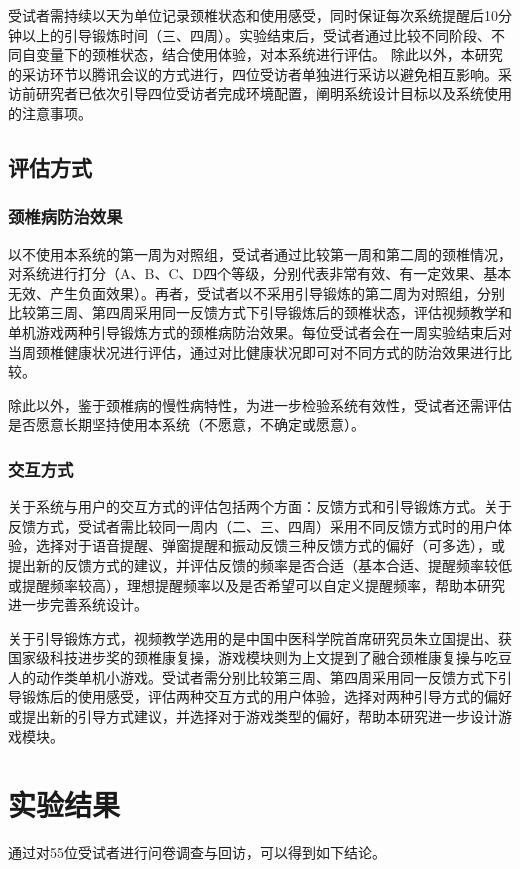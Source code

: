 \documentclass[12pt,a4paper]{article}%
\begin{document}
受试者需持续以天为单位记录颈椎状态和使用感受，同时保证每次系统提醒后10分钟以上的引导锻炼时间（三、四周）。实验结束后，受试者通过比较不同阶段、不同自变量下的颈椎状态，结合使用体验，对本系统进行评估。
除此以外，本研究的采访环节以腾讯会议的方式进行，四位受访者单独进行采访以避免相互影响。采访前研究者已依次引导四位受访者完成环境配置，阐明系统设计目标以及系统使用的注意事项。
\subsection{评估方式}
\subsubsection{颈椎病防治效果}
以不使用本系统的第一周为对照组，受试者通过比较第一周和第二周的颈椎情况，对系统进行打分（A、B、C、D四个等级，分别代表非常有效、有一定效果、基本无效、产生负面效果）。再者，受试者以不采用引导锻炼的第二周为对照组，分别比较第三周、第四周采用同一反馈方式下引导锻炼后的颈椎状态，评估视频教学和单机游戏两种引导锻炼方式的颈椎病防治效果。每位受试者会在一周实验结束后对当周颈椎健康状况进行评估，通过对比健康状况即可对不同方式的防治效果进行比较。


除此以外，鉴于颈椎病的慢性病特性，为进一步检验系统有效性，受试者还需评估是否愿意长期坚持使用本系统（不愿意，不确定或愿意）。
\subsubsection{交互方式}
关于系统与用户的交互方式的评估包括两个方面：反馈方式和引导锻炼方式。关于反馈方式，受试者需比较同一周内（二、三、四周）采用不同反馈方式时的用户体验，选择对于语音提醒、弹窗提醒和振动反馈三种反馈方式的偏好（可多选），或提出新的反馈方式的建议，并评估反馈的频率是否合适（基本合适、提醒频率较低或提醒频率较高），理想提醒频率以及是否希望可以自定义提醒频率，帮助本研究进一步完善系统设计。


关于引导锻炼方式，视频教学选用的是中国中医科学院首席研究员朱立国提出、获国家级科技进步奖的颈椎康复操\cite{朱立国2015颈椎康复操}，游戏模块则为上文提到了融合颈椎康复操与吃豆人的动作类单机小游戏。受试者需分别比较第三周、第四周采用同一反馈方式下引导锻炼后的使用感受，评估两种交互方式的用户体验，选择对两种引导方式的偏好或提出新的引导方式建议，并选择对于游戏类型的偏好，帮助本研究进一步设计游戏模块。
\section{实验结果}
通过对55位受试者进行问卷调查与回访，可以得到如下结论。
\end{document}
